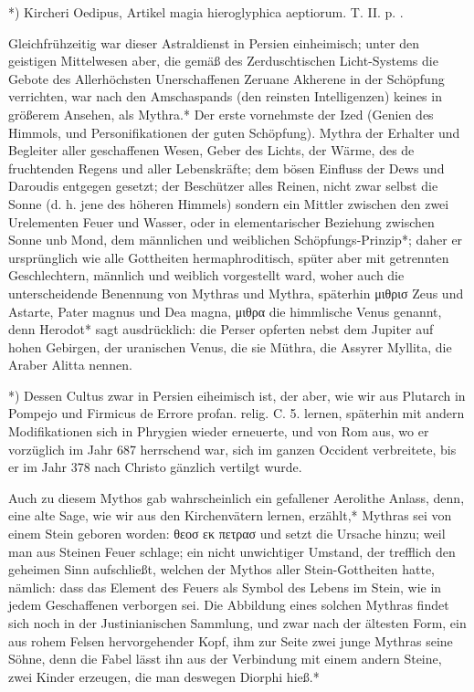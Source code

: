 \documentclass[a4paper, 11pt, oneside, polutonikogreek, german]{article}
\begin{document}
*) Kircheri Oedipus, Artikel magia hieroglyphica aeptiorum. T. II. p. .

Gleichfrühzeitig war dieser Astraldienst in Persien einheimisch; unter den geistigen Mittelwesen aber, die gemäß des Zerduschtischen Licht-Systems die Gebote des Allerhöchsten Unerschaffenen Zeruane Akherene in der Schöpfung verrichten, war nach den Amschaspands (den reinsten Intelligenzen) keines in größerem Ansehen, als Mythra.* Der erste vornehmste der Ized (Genien des Himmols, und Personifikationen der guten Schöpfung). Mythra der Erhalter und Begleiter aller geschaffenen Wesen, Geber des Lichts, der Wärme, des de fruchtenden Regens und aller Lebenskräfte; dem bösen Einfluss der Dews und Daroudis entgegen gesetzt; der Beschützer alles Reinen, nicht zwar selbst die Sonne (d. h. jene des höheren Himmels) sondern ein Mittler zwischen den zwei Urelementen Feuer und Wasser, oder in elementarischer Beziehung zwischen Sonne unb Mond, dem männlichen und weiblichen Schöpfungs-Prinzip*; daher er ursprünglich wie alle Gottheiten hermaphroditisch, spüter aber mit getrennten Geschlechtern, männlich und weiblich vorgestellt ward, woher auch die unterscheidende Benennung von Mythras und Mythra, späterhin μιθρισ Zeus und Astarte, Pater magnus und Dea magna, μιθρα die himmlische Venus genannt, denn Herodot* sagt ausdrücklich: die Perser opferten nebst dem Jupiter auf hohen Gebirgen, der uranischen Venus, die sie Müthra, die Assyrer Myllita, die Araber Alitta nennen.

*) Dessen Cultus zwar in Persien eiheimisch ist, der aber, wie wir aus Plutarch in Pompejo und Firmicus de Errore profan. relig. C. 5. lernen, späterhin mit andern Modifikationen sich in Phrygien wieder erneuerte, und von Rom aus, wo er vorzüglich im Jahr 687 herrschend war, sich im ganzen Occident verbreitete, bis er im Jahr 378 nach Christo gänzlich vertilgt wurde.

Auch zu diesem Mythos gab wahrscheinlich ein gefallener Aerolithe Anlass, denn, eine alte Sage, wie wir aus den Kirchenvätern lernen, erzählt,* Mythras sei von einem Stein geboren worden: θεοσ εκ πετρασ und setzt die Ursache hinzu; weil man aus Steinen Feuer schlage; ein nicht unwichtiger Umstand, der trefflich den geheimen Sinn aufschließt, welchen der Mythos aller Stein-Gottheiten hatte, nämlich: dass das Element des Feuers als Symbol des Lebens im Stein, wie in jedem Geschaffenen verborgen sei. Die Abbildung eines solchen Mythras findet sich noch in der Justinianischen Sammlung, und zwar nach der ältesten Form, ein aus rohem Felsen hervorgehender Kopf, ihm zur Seite zwei junge Mythras seine Söhne, denn die Fabel lässt ihn aus der Verbindung mit einem andern Steine, zwei Kinder erzeugen, die man deswegen Diorphi hieß.*
\end{document}
